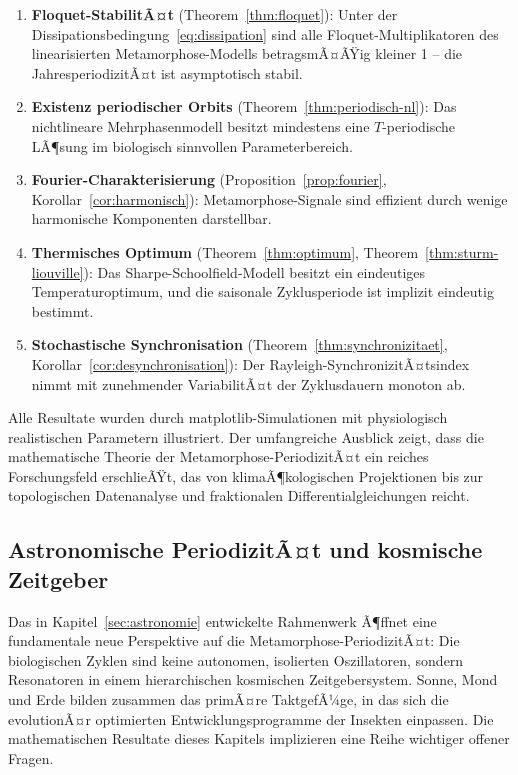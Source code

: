 ﻿\documentclass[12pt, a4paper]{article}
\theoremstyle{definition}
\begin{document}
\begin{enumerate}[leftmargin=1.5cm]
  \item \textbf{Floquet-StabilitÃ¤t} (Theorem~\ref{thm:floquet}): Unter der
    Dissipationsbedingung~\eqref{eq:dissipation} sind alle Floquet-Multiplikatoren
    des linearisierten Metamorphose-Modells betragsmÃ¤ÃŸig kleiner 1 -- die
    JahresperiodizitÃ¤t ist asymptotisch stabil.
  \item \textbf{Existenz periodischer Orbits} (Theorem~\ref{thm:periodisch-nl}):
    Das nichtlineare Mehrphasenmodell besitzt mindestens eine $T$-periodische
    LÃ¶sung im biologisch sinnvollen Parameterbereich.
  \item \textbf{Fourier-Charakterisierung} (Proposition~\ref{prop:fourier},
    Korollar~\ref{cor:harmonisch}): Metamorphose-Signale sind effizient durch
    wenige harmonische Komponenten darstellbar.
  \item \textbf{Thermisches Optimum} (Theorem~\ref{thm:optimum},
    Theorem~\ref{thm:sturm-liouville}): Das Sharpe-Schoolfield-Modell besitzt
    ein eindeutiges Temperaturoptimum, und die saisonale Zyklusperiode ist
    implizit eindeutig bestimmt.
  \item \textbf{Stochastische Synchronisation} (Theorem~\ref{thm:synchronizitaet},
    Korollar~\ref{cor:desynchronisation}): Der Rayleigh-SynchronizitÃ¤tsindex
    nimmt mit zunehmender VariabilitÃ¤t der Zyklusdauern monoton ab.
\end{enumerate}

Alle Resultate wurden durch matplotlib-Simulationen mit physiologisch
realistischen Parametern illustriert. Der umfangreiche Ausblick zeigt, dass
die mathematische Theorie der Metamorphose-PeriodizitÃ¤t ein reiches Forschungsfeld
erschlieÃŸt, das von klimaÃ¶kologischen Projektionen bis zur topologischen
Datenanalyse und fraktionalen Differentialgleichungen reicht.

\subsection{Astronomische PeriodizitÃ¤t und kosmische Zeitgeber}

Das in Kapitel~\ref{sec:astronomie} entwickelte Rahmenwerk Ã¶ffnet eine
fundamentale neue Perspektive auf die Metamorphose-PeriodizitÃ¤t: Die biologischen
Zyklen sind keine autonomen, isolierten Oszillatoren, sondern Resonatoren in einem
hierarchischen kosmischen Zeitgebersystem. Sonne, Mond und Erde bilden zusammen
das primÃ¤re TaktgefÃ¼ge, in das sich die evolutionÃ¤r optimierten Entwicklungsprogramme
der Insekten einpassen. Die mathematischen Resultate dieses Kapitels implizieren
eine Reihe wichtiger offener Fragen.
\end{document}
